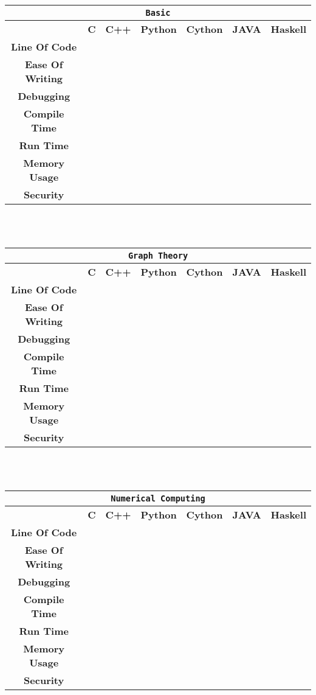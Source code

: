 \begin{tabular}{|c|c|c|c|c|c|c|}
\hline
\multicolumn{7}{|c|}{\texttt{Basic}}\\\hline
\textbf{} & \textbf{C} & \textbf{C++} & \textbf{Python} & \textbf{Cython} & \textbf{JAVA} & \textbf{Haskell}\\\hline
\textbf{Line Of Code} & & & & & &  \\
\hline
\textbf{Ease Of Writing} & & & & & & \\
\hline
\textbf{Debugging} & & & & & & \\
\hline
\textbf{Compile Time} & & & & & & \\
\hline
\textbf{Run Time} & & & & & & \\
\hline
\textbf{Memory Usage} & & & & & & \\
\hline
\textbf{Security} & & & & & & \\
\hline
\end{tabular}
\\
\linebreak
\\
\begin{tabular}{|c|c|c|c|c|c|c|}
\hline
\multicolumn{7}{|c|}{\texttt{Graph Theory}}\\\hline
\textbf{} & \textbf{C} & \textbf{C++} & \textbf{Python} & \textbf{Cython} & \textbf{JAVA} & \textbf{Haskell}\\\hline
\textbf{Line Of Code} & & & & & &  \\
\hline
\textbf{Ease Of Writing} & & & & & & \\
\hline
\textbf{Debugging} & & & & & & \\
\hline
\textbf{Compile Time} & & & & & & \\
\hline
\textbf{Run Time} & & & & & & \\
\hline
\textbf{Memory Usage} & & & & & & \\
\hline
\textbf{Security} & & & & & & \\
\hline
\end{tabular}
\\
\linebreak
\\
\begin{tabular}{|c|c|c|c|c|c|c|}
\hline
\multicolumn{7}{|c|}{\texttt{Numerical Computing}}\\\hline
\textbf{} & \textbf{C} & \textbf{C++} & \textbf{Python} & \textbf{Cython} & \textbf{JAVA} & \textbf{Haskell}\\\hline
\textbf{Line Of Code} & & & & & &  \\
\hline
\textbf{Ease Of Writing} & & & & & & \\
\hline
\textbf{Debugging} & & & & & & \\
\hline
\textbf{Compile Time} & & & & & & \\
\hline
\textbf{Run Time} & & & & & & \\
\hline
\textbf{Memory Usage} & & & & & & \\
\hline
\textbf{Security} & & & & & & \\
\hline
\end{tabular}
